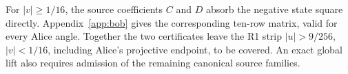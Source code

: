 \documentclass[10pt]{article}
\begin{document}
For $|v|\geq1/16$, the source coefficients $C$ and $D$ absorb the
negative state square directly. Appendix~\ref{app:bob} gives the
corresponding ten-row matrix, valid for every Alice angle. Together
the two certificates leave the R1 strip $|u|>9/256$, $|v|<1/16$,
including Alice's projective endpoint, to be covered. An exact global lift also requires admission of the
remaining canonical source families.

\appendix





\end{document}

